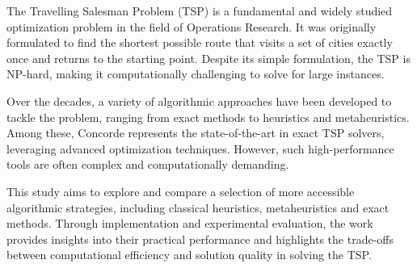 The Travelling Salesman Problem (TSP) is a fundamental and widely studied optimization problem in the field of Operations Research. It was originally formulated to find the shortest possible route that visits a set of cities exactly once and returns to the starting point. Despite its simple formulation, the TSP is NP-hard, making it computationally challenging to solve for large instances.

Over the decades, a variety of algorithmic approaches have been developed to tackle the problem, ranging from exact methods to heuristics and metaheuristics. Among these, Concorde represents the state-of-the-art in exact TSP solvers, leveraging advanced optimization techniques. However, such high-performance tools are often complex and computationally demanding.

This study aims to explore and compare a selection of more accessible algorithmic strategies, including classical heuristics, metaheuristics and exact methods. Through implementation and experimental evaluation, the work provides insights into their practical performance and highlights the trade-offs between computational efficiency and solution quality in solving the TSP.
